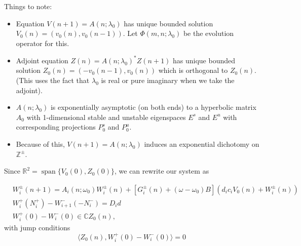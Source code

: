 \documentclass[12pt]{article}
\def\R{{\mathbb R}}
\def\C{{\mathbb C}}
\def\Z{{\mathbb Z}}
\DeclareMathOperator{\spn}{span}
\begin{document}
Things to note:
\begin{itemize}
\item Equation $V(n+1) = A(n; \lambda_0)$ has unique bounded solution $V_0(n) = (v_0(n), v_0(n-1))$. Let $\Phi(m, n; \lambda_0)$ be the evolution operator for this.
\item Adjoint equation $Z(n) = A(n; \lambda_0)^* Z(n+1)$ has unique bounded solution $Z_0(n) = (-v_0(n-1), v_0(n))$ which is orthogonal to $Z_0(n)$. (This uses the fact that $\lambda_0$ is real or pure imaginary when we take the adjoint).
\item $A(n; \lambda_0)$ is exponentially asymptotic (on both ends) to a hyperbolic matrix $A_0$ with 1-dimensional stable and unstable eigenspaces $E^s$ and $E^u$ with corresponding projections $P_0^s$ and $P_0^u$.
\item Because of this, $V(n+1) = A(n; \lambda_0)$ induces an exponential dichotomy on $\Z^\pm$.
\end{itemize}

Since $\R^2 = \spn\{ V_0(0), Z_0(0) \}$, we can rewrite our system as 

\begin{equation}\label{eq:eigWsystem2}
\begin{aligned}
&W_i^\pm(n+1)
= A_i(n; \omega_0) W_i^\pm(n) + [G_i^\pm(n) + (\omega - \omega_0) B](d_i c_i V_0(n) + W_i^\pm(n))\\
&W_i^+(N_i^+) - W_{i+1}^-(-N_i^-) = D_i d \\
&W_i^+(0) - W_i^-(0) \in \C Z_0(n),
\end{aligned}
\end{equation}
with jump conditions
\begin{equation}
\langle Z_0(n), W_i^+(0) - W_i^-(0) \rangle = 0
\end{equation}
\end{document}
